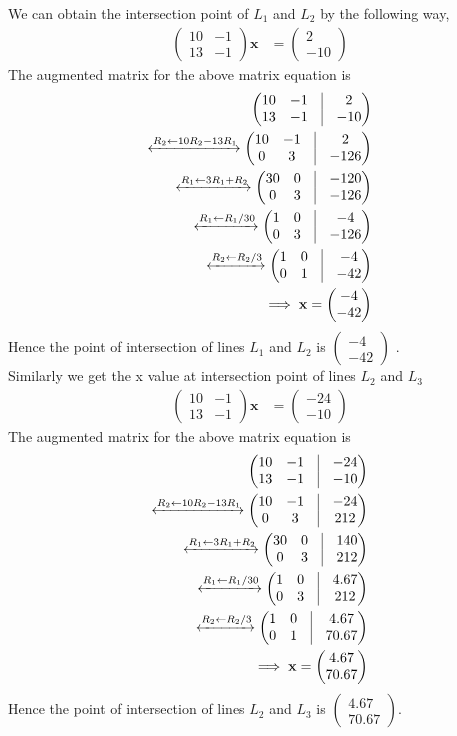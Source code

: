 \documentclass[16pt, a4paper, two column]{article}
\newcommand{\myvec}[1]{\ensuremath{\begin{pmatrix}#1\end{pmatrix}}}
\let\vec\mathbf
\begin{document}
We can obtain the intersection point of $L_1$ and $L_2$ by the following way,
\begin{align*}
	\myvec{10 & -1 \\
		13 & -1}\vec{x} &= \myvec{2 \\ -10} 
\end{align*}
The augmented matrix for the above matrix equation is 
\begin{align*}
	\myvec{ 10 & -1 & \vrule & 2 \\
		13 & -1 & \vrule & -10} \\
	\xleftrightarrow[]{R_2 \leftarrow 10R_2-13R_1}
		\myvec{ 10 & -1 & \vrule & 2 \\
			0 & 3 & \vrule & -126} \\
	\xleftrightarrow[]{R_1 \leftarrow 3R_1+R_2}
		\myvec{ 30 & 0 & \vrule & -120 \\
			0 & 3 &\vrule & -126} \\
	\xleftrightarrow[]{R_1 \leftarrow R_1/30}
		\myvec{ 1 & 0 & \vrule & -4 \\
			0 & 3 & \vrule & -126} \\
	\xleftrightarrow[]{ R_2 \leftarrow R_2/3}
		\myvec{ 1 & 0 & \vrule & -4 \\
			0 & 1 & \vrule & -42} \\
	\implies \vec{x} = \myvec{-4 \\ -42}
\end{align*}
Hence the point of intersection of lines $L_1$ and $L_2$ is $\myvec{-4 \\ -42}$ .\\
Similarly we get the x value at intersection point of lines $L_2$ and $L_3$
\begin{align*}
	\myvec{10 & -1 \\
		13 & -1}\vec{x} &= \myvec{-24 \\ -10}
\end{align*}
The augmented matrix for the above matrix equation is 
\begin{align*}
	\myvec{ 10 & -1 & \vrule & -24 \\
		13 & -1 & \vrule & -10} \\
	\xleftrightarrow[]{R_2 \leftarrow 10R_2-13R_1}
		\myvec{ 10 & -1 & \vrule & -24 \\
			0 & 3 & \vrule & 212} \\
	\xleftrightarrow[]{R_1 \leftarrow 3R_1+R_2}
		\myvec{ 30 & 0 & \vrule & 140 \\
			0 & 3 &\vrule & 212} \\
	\xleftrightarrow[]{R_1 \leftarrow R_1/30}
		\myvec{ 1 & 0 & \vrule &  4.67\\
			0 & 3 & \vrule & 212} \\
	\xleftrightarrow[]{R_2 \leftarrow R_2/3}
		\myvec{ 1 & 0 & \vrule &  4.67\\
			0 & 1 & \vrule & 70.67} \\
	\implies \vec{x} = \myvec{4.67 \\ 70.67}
\end{align*}
Hence the point of intersection of lines $L_2$ and $L_3$ is $\myvec{4.67 \\ 70.67}$.\\
\vspace{16pt}
\end{document}
